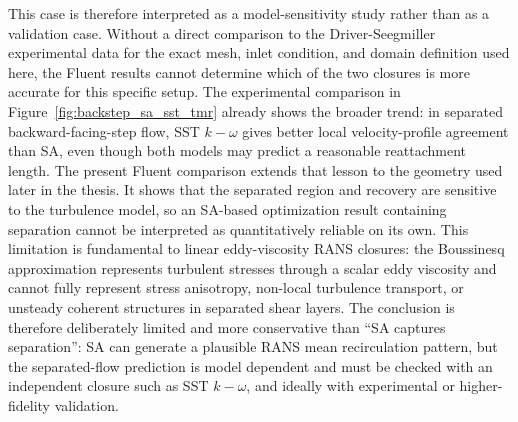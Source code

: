 This case is therefore interpreted as a model-sensitivity study rather than as a validation case. Without a direct comparison to the Driver-Seegmiller experimental data for the exact mesh, inlet condition, and domain definition used here, the Fluent results cannot determine which of the two closures is more accurate for this specific setup. The experimental comparison in Figure~\ref{fig:backstep_sa_sst_tmr} already shows the broader trend: in separated backward-facing-step flow, SST $k-\omega$ gives better local velocity-profile agreement than SA, even though both models may predict a reasonable reattachment length. The present Fluent comparison extends that lesson to the geometry used later in the thesis. It shows that the separated region and recovery are sensitive to the turbulence model, so an SA-based optimization result containing separation cannot be interpreted as quantitatively reliable on its own. This limitation is fundamental to linear eddy-viscosity RANS closures: the Boussinesq approximation represents turbulent stresses through a scalar eddy viscosity and cannot fully represent stress anisotropy, non-local turbulence transport, or unsteady coherent structures in separated shear layers. The conclusion is therefore deliberately limited and more conservative than ``SA captures separation'': SA can generate a plausible RANS mean recirculation pattern, but the separated-flow prediction is model dependent and must be checked with an independent closure such as SST $k-\omega$, and ideally with experimental or higher-fidelity validation.

\FloatBarrier
